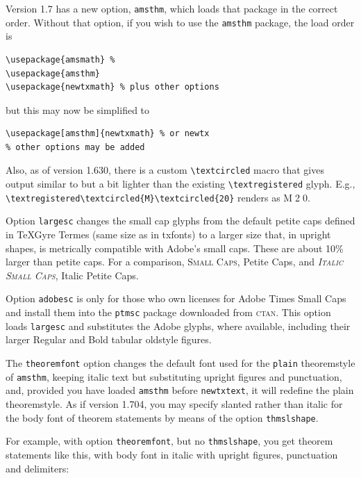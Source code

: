 \documentclass[\fsc]{article}
\theoremstyle{oldplain}
\theoremstyle{plain}
\begin{document}
Version 1.7 has a new option, {\tt amsthm}, which loads that package in the correct order. Without that option, if you wish to use the {\tt amsthm} package, the load order is
\begin{verbatim}
\usepackage{amsmath} %
\usepackage{amsthm}
\usepackage{newtxmath} % plus other options
\end{verbatim}
but this may now be simplified to
\begin{verbatim}
\usepackage[amsthm]{newtxmath} % or newtx
% other options may be added
\end{verbatim}

Also, as of version 1.630, there is a custom \verb|\textcircled| macro that gives output similar to but a bit lighter than the existing \verb|\textregistered| glyph. E.g., \verb|\textregistered\textcircled{M}\textcircled{20}| renders as \textregistered\textcircled{M}\textcircled{20}.

Option \texttt{largesc} changes the small cap glyphs from the default petite caps defined in TeXGyre Termes (same size as in txfonts) to a larger size that, in upright shapes, is metrically compatible with Adobe's small caps. These are about 10\% larger than petite caps. For a comparison, \textsc{Small Caps}, {Petite Caps}, and \textsc{\textit{Italic Small Caps}}, {Italic Petite Caps}.

Option \texttt{adobesc} is only for those who own licenses for \textsf{Adobe Times Small Caps} and install them into the \texttt{ptmsc} package downloaded from \textsc{ctan}. This option loads \texttt{largesc} and substitutes the Adobe glyphs, where available, including their larger Regular and Bold tabular oldstyle figures.

The {\tt theoremfont} option changes the default font used for the {\tt plain} theoremstyle of {\tt amsthm}, keeping italic text but substituting upright figures and punctuation, and, provided you have loaded {\tt amsthm} before {\tt newtxtext}, it will redefine the plain theoremstyle.  As if version 1.704, you may specify slanted rather than italic for the body font of theorem statements by means of the option {\tt thmslshape}. 

For example, with option {\tt theoremfont}, but no {\tt thmslshape}, you get theorem statements like this, with body font in italic with upright figures, punctuation and delimiters:

\end{document}
